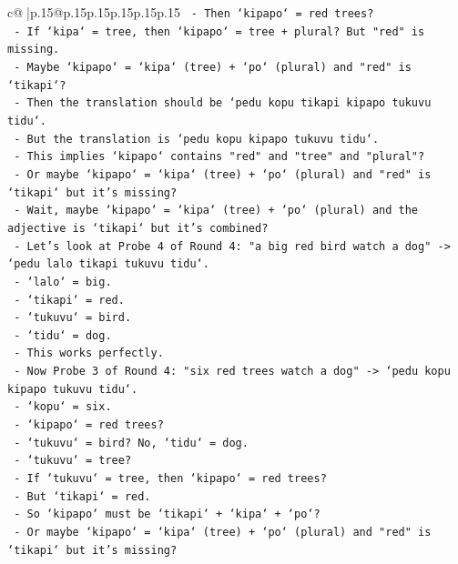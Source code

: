 \documentclass{article}
\begin{document}
{\begin{supertabular}{c@{$\;$}|p{.15\linewidth}@{}p{.15\linewidth}p{.15\linewidth}p{.15\linewidth}p{.15\linewidth}p{.15\linewidth}}
{{{\texttt{        {-} Then `kipapo` = red trees?} \\
\texttt{        {-} If `kipa` = tree, then `kipapo` = tree + plural? But "red" is missing.} \\
\texttt{        {-} Maybe `kipapo` = `kipa` (tree) + `po` (plural) and "red" is `tikapi`?} \\
\texttt{        {-} Then the translation should be `pedu kopu tikapi kipapo tukuvu tidu`.} \\
\texttt{        {-} But the translation is `pedu kopu kipapo tukuvu tidu`.} \\
\texttt{        {-} This implies `kipapo` contains "red" and "tree" and "plural"?} \\
\texttt{        {-} Or maybe `kipapo` = `kipa` (tree) + `po` (plural) and "red" is `tikapi` but it's missing?} \\
\texttt{        {-} Wait, maybe `kipapo` = `kipa` (tree) + `po` (plural) and the adjective is `tikapi` but it's combined?} \\
\texttt{        {-} Let's look at Probe 4 of Round 4: "a big red bird watch a dog" {-}> `pedu lalo tikapi tukuvu tidu`.} \\
\texttt{          {-} `lalo` = big.} \\
\texttt{          {-} `tikapi` = red.} \\
\texttt{          {-} `tukuvu` = bird.} \\
\texttt{          {-} `tidu` = dog.} \\
\texttt{          {-} This works perfectly.} \\
\texttt{        {-} Now Probe 3 of Round 4: "six red trees watch a dog" {-}> `pedu kopu kipapo tukuvu tidu`.} \\
\texttt{          {-} `kopu` = six.} \\
\texttt{          {-} `kipapo` = red trees?} \\
\texttt{          {-} `tukuvu` = bird? No, `tidu` = dog.} \\
\texttt{          {-} `tukuvu` = tree?} \\
\texttt{          {-} If `tukuvu` = tree, then `kipapo` = red trees?} \\
\texttt{          {-} But `tikapi` = red.} \\
\texttt{          {-} So `kipapo` must be `tikapi` + `kipa` + `po`?} \\
\texttt{          {-} Or maybe `kipapo` = `kipa` (tree) + `po` (plural) and "red" is `tikapi` but it's missing?} \\
}}}
\end{supertabular}}
\end{document}
